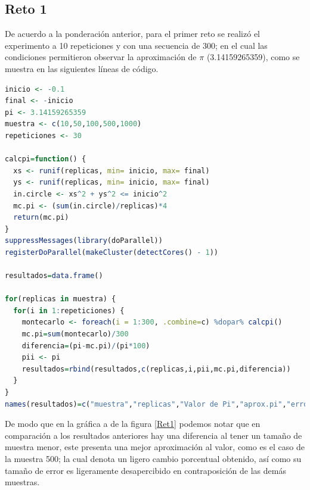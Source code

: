 \documentclass[12pt, letterpaper] {article}
\begin{document}
\subsection{Reto 1}

De acuerdo a la ponderación anterior, para el primer reto se realizó el experimento a 10 repeticiones y con una secuencia de 300; en el cual las condiciones permitieron observar la aproximación de $\pi$ (3.14159265359), como se muestra en las siguientes líneas de código.

\begin{lstlisting}[language=R]
inicio <- -0.1
final <- -inicio
pi <- 3.14159265359
muestra <- c(10,50,100,500,1000)
repeticiones <- 30

calcpi=function() {
  xs <- runif(replicas, min= inicio, max= final)
  ys <- runif(replicas, min= inicio, max= final)
  in.circle <- xs^2 + ys^2 <= inicio^2
  mc.pi <- (sum(in.circle)/replicas)*4
  return(mc.pi) 
}
suppressMessages(library(doParallel)) 
registerDoParallel(makeCluster(detectCores() - 1)) 

resultados=data.frame() 

for(replicas in muestra) { 
  for(i in 1:repeticiones) { 
    montecarlo <- foreach(i = 1:300, .combine=c) %dopar% calcpi() 
    mc.pi=sum(montecarlo)/300
    diferencia=(pi-mc.pi)/(pi*100) 
    pii <- pi
    resultados=rbind(resultados,c(replicas,i,pii,mc.pi,diferencia))
  }
}
names(resultados)=c("muestra","replicas","Valor de Pi","aprox.pi","error") 
\end{lstlisting}

De modo que en la gráfica a de la figura \ref{Ret1} podemos notar que en comparación a los resultados anteriores hay una diferencia al tener un tamaño de muestra menor, este presenta una mejor aproximación al valor, como es el caso de la muestra 500; la cual denota un ligero cambio porcentual obtenido, así como su tamaño de error es ligeramente desapercibido en contraposición de las demás muestras.
\end{document}
